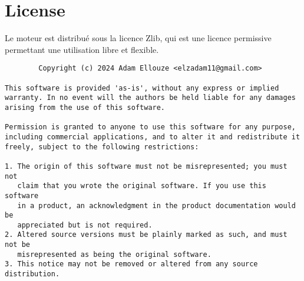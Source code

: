 \documentclass{article}
\numberwithin{equation}{section}    %
\begin{document}
    \section{License}
    Le moteur est distribué sous la licence Zlib, qui est une licence permissive permettant une utilisation libre et flexible.

    \begin{lstlisting}
        Copyright (c) 2024 Adam Ellouze <elzadam11@gmail.com>

This software is provided 'as-is', without any express or implied
warranty. In no event will the authors be held liable for any damages
arising from the use of this software.

Permission is granted to anyone to use this software for any purpose,
including commercial applications, and to alter it and redistribute it
freely, subject to the following restrictions:

1. The origin of this software must not be misrepresented; you must not
   claim that you wrote the original software. If you use this software
   in a product, an acknowledgment in the product documentation would be
   appreciated but is not required.
2. Altered source versions must be plainly marked as such, and must not be
   misrepresented as being the original software.
3. This notice may not be removed or altered from any source distribution.
    \end{lstlisting}
\end{document}

